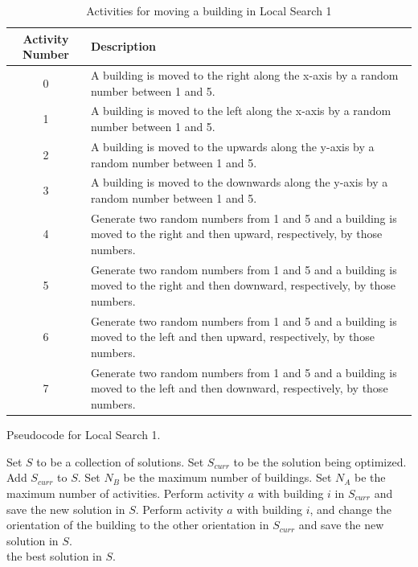 \begin{table}[h!]
	\centering
	\begin{tabular}{| c | p{110mm} |}
		\hline
		Activity Number & Description \\
		\hline
		0 & A building is moved to the right along the x-axis by a random number between 1 and 5. \\
		1 & A building is moved to the left along the x-axis by a random number between 1 and 5. \\
		2 & A building is moved to the upwards along the y-axis by a random number between 1 and 5. \\
		3 & A building is moved to the downwards along the y-axis by a random number between 1 and 5. \\
		4 & Generate two random numbers from 1 and 5 and a building is moved to the right and then upward, respectively, by those numbers. \\
		5 & Generate two random numbers from 1 and 5 and a building is moved to the right and then downward, respectively, by those numbers. \\
		6 & Generate two random numbers from 1 and 5 and a building is moved to the left and then upward, respectively, by those numbers. \\
		7 & Generate two random numbers from 1 and 5 and a building is moved to the left and then downward, respectively, by those numbers. \\
		\hline
	\end{tabular}
	\caption{Activities for moving a building in Local Search 1}
	\label{local-search-1-activities}
\end{table}

\begin{algorithm}[h!]
\caption{Pseudocode for Local Search 1.}
\label{pseudocode-local-search-1}
\begin{algorithmic}[1]
\State Set $S$ to be a collection of solutions.
\State Set $S_{curr}$ to be the solution being optimized.
\State Add $S_{curr}$ to $S$.
\State Set $N_{B}$ be the maximum number of buildings.
\State Set $N_{A}$ be the maximum number of activities.
		\State Perform activity $a$ with building $i$ in $S_{curr}$ and save the new solution in $S$.
		\State Perform activity $a$ with building $i$, and change the orientation of the building to the other orientation in $S_{curr}$ and save the new solution in $S$.
	\EndFor
\EndFor \\
\Return the best solution in $S$.
\end{algorithmic}
\end{algorithm}

